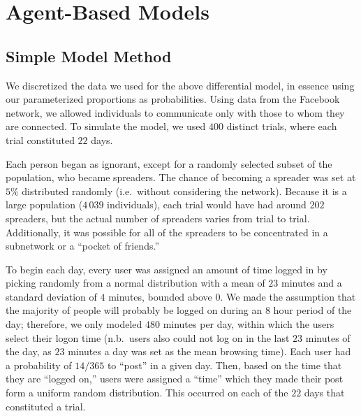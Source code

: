 \section{Agent-Based Models }
\label{sec:abmodel}

\subsection{Simple Model Method}
\label{subsec:abmodelsetup}

\noindent We discretized the data we used for the above differential model, in essence using our parameterized proportions as probabilities.
Using data from the Facebook network, we allowed individuals to communicate only with those to whom they are connected.
To simulate the model, we used $ 400 $ distinct trials, where each trial constituted $ 22 $ days.

Each person began as ignorant, except for a randomly selected subset of the population, who became spreaders.
The chance of becoming a spreader was set at $ 5\% $ distributed randomly (i.e.\ without considering the network).
Because it is a large population ($ 4\,039 $ individuals), each trial would have had around $ 202 $ spreaders, but the actual number of spreaders varies from trial to trial.
Additionally,  it was possible for all of the spreaders to be concentrated in a subnetwork or a ``pocket of friends.''

To begin each day, every user was assigned an amount of time logged in by picking randomly from a normal distribution with a mean of $ 23 $ minutes and a standard deviation of $ 4 $ minutes, bounded above $ 0 $.
We made the assumption that the majority of people will probably be logged on during an $8$ hour period of the day; therefore, we only modeled $480$ minutes per day, within which the users select their logon time (n.b.\ users also could not log on in the last $ 23 $ minutes of the day, as $ 23 $ minutes a day was set as the mean browsing time).
Each user had a probability of $14/365$ to ``post'' in a given day.
Then, based on the time that they are ``logged on,'' users were assigned a ``time'' which they made their post form a uniform random distribution.
This occurred on each of the $ 22 $ days that constituted a trial.

